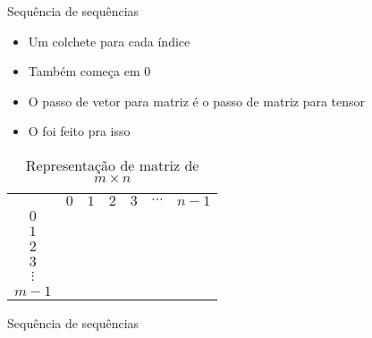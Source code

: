 \documentclass[14pt]{beamer}
\begin{document}
		\begin{frame}{Sequência de sequências}
			\begin{itemize}
				\presentationPause\item Um colchete para cada índice
				\presentationPause\item Também começa em $0$
				\presentationPause\item O passo de vetor para matriz é o passo de matriz para tensor
				\presentationPause\item O  foi feito pra isso
			\end{itemize}
			\begin{table}[H]
				\centering
				\caption{Representação de matriz de $m\times n$}
				\label{table.matrix}
				\begin{tabular}{ccccccc}
					& $0$                      & $1$                     & $2$                     & $3$                     & $\cdots$                & $n-1$                     \\ \cline{2-7}
					$0$ & \multicolumn{1}{|l|}{} & \multicolumn{1}{l|}{} & \multicolumn{1}{l|}{} & \multicolumn{1}{l|}{} & \multicolumn{1}{l|}{} & \multicolumn{1}{l|}{} \\ \cline{2-7}
					$1$ & \multicolumn{1}{|l|}{} & \multicolumn{1}{l|}{} & \multicolumn{1}{l|}{} & \multicolumn{1}{l|}{} & \multicolumn{1}{l|}{} & \multicolumn{1}{l|}{} \\ \cline{2-7}
					$2$ & \multicolumn{1}{|l|}{} & \multicolumn{1}{l|}{} & \multicolumn{1}{l|}{} & \multicolumn{1}{l|}{} & \multicolumn{1}{l|}{} & \multicolumn{1}{l|}{} \\ \cline{2-7}
					$3$ & \multicolumn{1}{|l|}{} & \multicolumn{1}{l|}{} & \multicolumn{1}{l|}{} & \multicolumn{1}{l|}{} & \multicolumn{1}{l|}{} & \multicolumn{1}{l|}{} \\ \cline{2-7}
					$\vdots$ & \multicolumn{1}{|l|}{} & \multicolumn{1}{l|}{} & \multicolumn{1}{l|}{} & \multicolumn{1}{l|}{} & \multicolumn{1}{l|}{} & \multicolumn{1}{l|}{} \\ \cline{2-7}
					$m-1$ & \multicolumn{1}{|l|}{} & \multicolumn{1}{l|}{} & \multicolumn{1}{l|}{} & \multicolumn{1}{l|}{} & \multicolumn{1}{l|}{} & \multicolumn{1}{l|}{} \\ \cline{2-7}
					\end{tabular}
				\end{table}
			\end{frame}

			\begin{frame}{Sequência de sequências}
				\presentationPause
			\end{frame}
	
\end{document}
